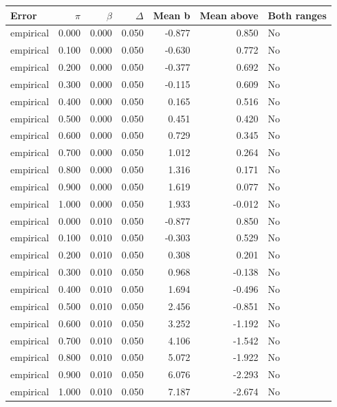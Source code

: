 \begingroup\small
\setlength{\tabcolsep}{3.5pt}
\begin{tabular}{lrrrrrl}
\toprule
Error & $\pi$ & $\beta$ & $\Delta$ & Mean b & Mean above & Both ranges \\
\midrule
empirical & 0.000 & 0.000 & 0.050 & -0.877 & 0.850 & No \\
empirical & 0.100 & 0.000 & 0.050 & -0.630 & 0.772 & No \\
empirical & 0.200 & 0.000 & 0.050 & -0.377 & 0.692 & No \\
empirical & 0.300 & 0.000 & 0.050 & -0.115 & 0.609 & No \\
empirical & 0.400 & 0.000 & 0.050 & 0.165 & 0.516 & No \\
empirical & 0.500 & 0.000 & 0.050 & 0.451 & 0.420 & No \\
empirical & 0.600 & 0.000 & 0.050 & 0.729 & 0.345 & No \\
empirical & 0.700 & 0.000 & 0.050 & 1.012 & 0.264 & No \\
empirical & 0.800 & 0.000 & 0.050 & 1.316 & 0.171 & No \\
empirical & 0.900 & 0.000 & 0.050 & 1.619 & 0.077 & No \\
empirical & 1.000 & 0.000 & 0.050 & 1.933 & -0.012 & No \\
empirical & 0.000 & 0.010 & 0.050 & -0.877 & 0.850 & No \\
empirical & 0.100 & 0.010 & 0.050 & -0.303 & 0.529 & No \\
empirical & 0.200 & 0.010 & 0.050 & 0.308 & 0.201 & No \\
empirical & 0.300 & 0.010 & 0.050 & 0.968 & -0.138 & No \\
empirical & 0.400 & 0.010 & 0.050 & 1.694 & -0.496 & No \\
empirical & 0.500 & 0.010 & 0.050 & 2.456 & -0.851 & No \\
empirical & 0.600 & 0.010 & 0.050 & 3.252 & -1.192 & No \\
empirical & 0.700 & 0.010 & 0.050 & 4.106 & -1.542 & No \\
empirical & 0.800 & 0.010 & 0.050 & 5.072 & -1.922 & No \\
empirical & 0.900 & 0.010 & 0.050 & 6.076 & -2.293 & No \\
empirical & 1.000 & 0.010 & 0.050 & 7.187 & -2.674 & No \\
\bottomrule
\end{tabular}
\par\medskip
